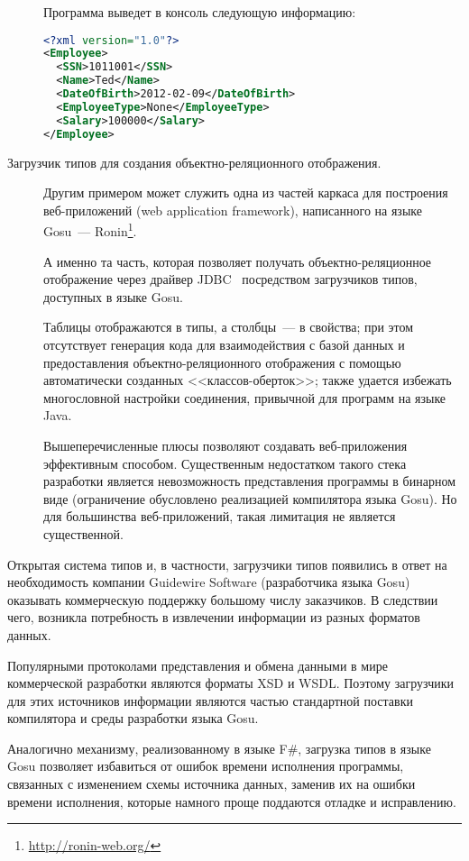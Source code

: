\begin{description}
\begin{code}
Программа выведет в консоль следующую информацию:
\begin{lstlisting}[language=xml, caption={Результат работы программы \ref{gosu-xsd-loader}.}, label=gosu-xsd-loader-result]
<?xml version="1.0"?>
<Employee>
  <SSN>1011001</SSN>
  <Name>Ted</Name>
  <DateOfBirth>2012-02-09</DateOfBirth>
  <EmployeeType>None</EmployeeType>
  <Salary>100000</Salary>
</Employee>
\end{lstlisting}

\end{code}


\item[Загрузчик типов для создания объектно-реляционного отображения.] Другим примером может служить одна из частей каркаса для построения веб-приложений (web application framework), написанного на языке Gosu~--- Ronin\footnote{\url{http://ronin-web.org/}}.

А именно та часть, которая позволяет получать объектно-реляционное отображение через драйвер JDBC~\cite{jdbc-book} посредством загрузчиков типов, доступных в языке Gosu.

Таблицы отображаются в типы, а столбцы~--- в свойства; при этом отсутствует генерация кода для взаимодействия с базой данных и предоставления объектно-реляционного отображения с помощью автоматически созданных <<классов-оберток>>; также удается избежать многословной настройки соединения, привычной для программ на языке Java.

Вышеперечисленные плюсы позволяют создавать веб-приложения эффективным способом. Существенным недостатком такого стека разработки является невозможность представления программы в бинарном виде (ограничение обусловлено реализацией компилятора языка Gosu). Но для большинства веб-приложений, такая лимитация не является существенной.

\end{description}

Открытая система типов и, в частности, загрузчики типов появились в ответ на необходимость компании Guidewire Software (разработчика языка Gosu) оказывать коммерческую поддержку большому числу заказчиков.
В следствии чего, возникла потребность в извлечении информации из разных форматов данных.

Популярными протоколами представления и обмена данными в мире коммерческой разработки являются форматы XSD и WSDL. Поэтому загрузчики для этих источников информации являются частью стандартной поставки компилятора и среды разработки языка Gosu.

Аналогично механизму, реализованному в языке F\#, загрузка типов в языке Gosu позволяет избавиться от ошибок времени исполнения программы, связанных с изменением схемы источника данных, заменив их на ошибки времени исполнения, которые намного проще поддаются отладке и исправлению.